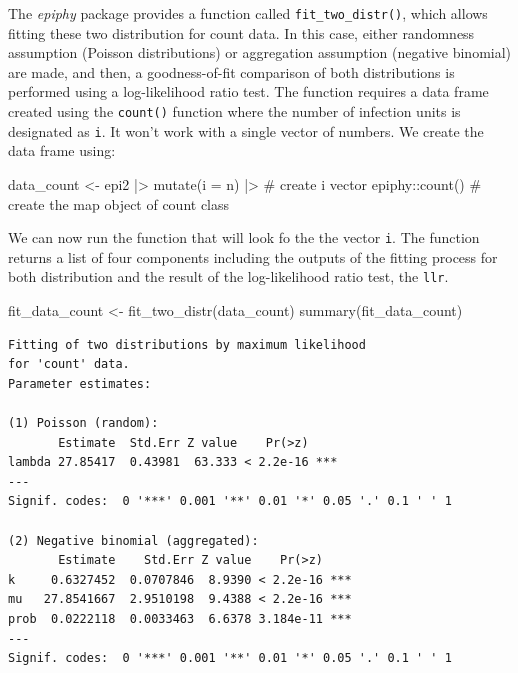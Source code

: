 \documentclass[
  letterpaper,
]{book}
\newenvironment{Shaded}{\begin{snugshade}}{\end{snugshade}}
\newcommand{\AttributeTok}[1]{\textcolor[rgb]{0.40,0.45,0.13}{#1}}
\newcommand{\CommentTok}[1]{\textcolor[rgb]{0.37,0.37,0.37}{#1}}
\newcommand{\FunctionTok}[1]{\textcolor[rgb]{0.28,0.35,0.67}{#1}}
\newcommand{\NormalTok}[1]{\textcolor[rgb]{0.00,0.23,0.31}{#1}}
\newcommand{\OtherTok}[1]{\textcolor[rgb]{0.00,0.23,0.31}{#1}}
\newcommand{\SpecialCharTok}[1]{\textcolor[rgb]{0.37,0.37,0.37}{#1}}
\begin{document}
The \emph{epiphy} package provides a function called
\texttt{fit\_two\_distr()}, which allows fitting these two distribution
for count data. In this case, either randomness assumption (Poisson
distributions) or aggregation assumption (negative binomial) are made,
and then, a goodness-of-fit comparison of both distributions is
performed using a log-likelihood ratio test. The function requires a
data frame created using the \texttt{count()} function where the number
of infection units is designated as \texttt{i}. It won't work with a
single vector of numbers. We create the data frame using:

\begin{Shaded}
\begin{Highlighting}[]
\NormalTok{data\_count }\OtherTok{\textless{}{-}}\NormalTok{ epi2 }\SpecialCharTok{|\textgreater{}} 
  \FunctionTok{mutate}\NormalTok{(}\AttributeTok{i =}\NormalTok{ n) }\SpecialCharTok{|\textgreater{}}  \CommentTok{\# create i vector}
\NormalTok{  epiphy}\SpecialCharTok{::}\FunctionTok{count}\NormalTok{()   }\CommentTok{\# create the map object of count class}
\end{Highlighting}
\end{Shaded}

We can now run the function that will look fo the the vector \texttt{i}.
The function returns a list of four components including the outputs of
the fitting process for both distribution and the result of the
log-likelihood ratio test, the \texttt{llr}.

\begin{Shaded}
\begin{Highlighting}[]
\NormalTok{fit\_data\_count }\OtherTok{\textless{}{-}} \FunctionTok{fit\_two\_distr}\NormalTok{(data\_count)}
\FunctionTok{summary}\NormalTok{(fit\_data\_count)}
\end{Highlighting}
\end{Shaded}

\begin{verbatim}
Fitting of two distributions by maximum likelihood
for 'count' data.
Parameter estimates:

(1) Poisson (random):
       Estimate  Std.Err Z value    Pr(>z)    
lambda 27.85417  0.43981  63.333 < 2.2e-16 ***
---
Signif. codes:  0 '***' 0.001 '**' 0.01 '*' 0.05 '.' 0.1 ' ' 1

(2) Negative binomial (aggregated):
       Estimate    Std.Err Z value    Pr(>z)    
k     0.6327452  0.0707846  8.9390 < 2.2e-16 ***
mu   27.8541667  2.9510198  9.4388 < 2.2e-16 ***
prob  0.0222118  0.0033463  6.6378 3.184e-11 ***
---
Signif. codes:  0 '***' 0.001 '**' 0.01 '*' 0.05 '.' 0.1 ' ' 1
\end{verbatim}
\end{document}
